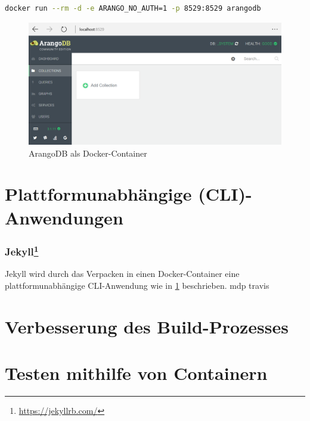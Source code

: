 \begin{lstlisting}[caption=Docker-Kommando zum Starten von ArangoDB, language=bash, label=lst:docker-run-arangodb]
docker run --rm -d -e ARANGO_NO_AUTH=1 -p 8529:8529 arangodb
\end{lstlisting}

\begin{figure}[htbp]
    \centering
    \includegraphics[width=0.8\linewidth,clip]{images/arangodb-demo}
    \caption{ArangoDB als Docker-Container}
\label{fig:arangodb-result}
\end{figure}



\section{Plattformunabhängige (CLI)-Anwendungen}
\label{sec:cross-platform-applications}

\subsubsection{Jekyll\protect\footnote{\url{https://jekyllrb.com/}}}

Jekyll wird durch das Verpacken in einen Docker-Container eine plattformunabhängige CLI-Anwendung wie in \cref{sec:cross-platform-applications} beschrieben.
mdp
travis
\section{Verbesserung des Build-Prozesses}
\label{sec:build-prozess-verbesserung}

\section{Testen mithilfe von Containern}
\label{sec:containerbasiertes-testen}
